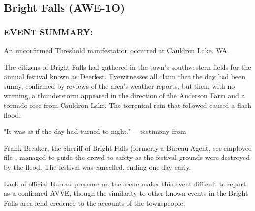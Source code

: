 \subsection*{Bright Falls (AWE-1O)}
\subsubsection*{EVENT SUMMARY:}
\par An unconfirmed Threshold manifestation occurred at Cauldron
Lake, WA.
\par The citizens of Bright Falls had gathered in the town's
southwestern fields for the annual festival known as Deerfest.
Eyewitnesses all claim that the day had been sunny, confirmed by
reviews of the area's weather reports, but then, with no warning,
a thunderstorm appeared in the direction of the Anderson Farm
and a tornado rose from Cauldron Lake. The torrential rain that
followed caused a flash flood.
\par "It was as if the day had turned to night." —testimony from 
\par Frank Breaker, the Sheriff of Bright Falls (formerly a Bureau
Agent, see employee file , managed to guide the
crowd to safety as the festival grounds were destroyed by the
flood. The festival was cancelled, ending one day early.
\par Lack of official Bureau presence on the scene makes this event
difficult to report as a confirmed AVVE, though the similarity to
other known events in the Bright Falls area lend credence to the
accounts of the townspeople.